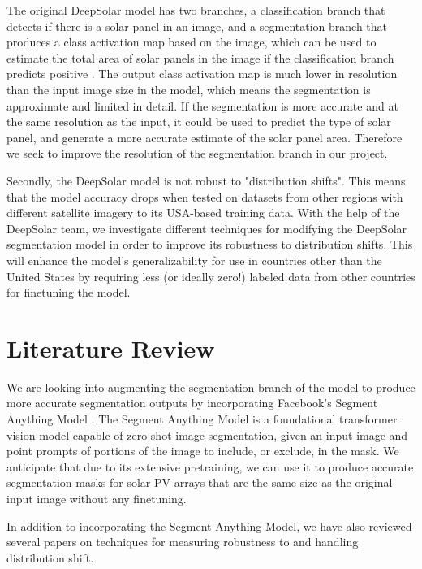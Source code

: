\documentclass[10pt,twocolumn,letterpaper]{article}
\begin{document}
The original DeepSolar model has two branches, a classification branch that detects if there is a solar panel in an image, and a segmentation branch that produces a class activation map based on the image, which can be used to estimate the total area of solar panels in the image if the classification branch predicts positive \cite{DeepSolar1}. The output class activation map is much lower in resolution than the input image size in the model, which means the segmentation is approximate and limited in detail. If the segmentation is more accurate and at the same resolution as the input, it could be used to predict the type of solar panel, and generate a more accurate estimate of the solar panel area. Therefore we seek to improve the resolution of the segmentation branch in our project.

Secondly, the DeepSolar model is not robust to "distribution shifts". This means that the model accuracy drops when tested on datasets from other regions with different satellite imagery to its USA-based training data. With the help of the DeepSolar team, we investigate different techniques for modifying the DeepSolar segmentation model in order to improve its robustness to distribution shifts. This will enhance the model's generalizability for use in countries other than the United States by requiring less (or ideally zero!) labeled data from other countries for finetuning the model.


\section{Literature Review}
 
We are looking into augmenting the segmentation branch of the model to produce more accurate segmentation outputs by incorporating Facebook's Segment Anything Model \cite{kirillov2023segment}. The Segment Anything Model is a foundational transformer vision model capable of zero-shot image segmentation, given an input image and point prompts of portions of the image to include, or exclude, in the mask. We anticipate that due to its extensive pretraining, we can use it to produce accurate segmentation masks for solar PV arrays that are the same size as the original input image without any finetuning.

In addition to incorporating the Segment Anything Model, we have also reviewed several papers on techniques for measuring robustness to and handling distribution shift. 
\end{document}
